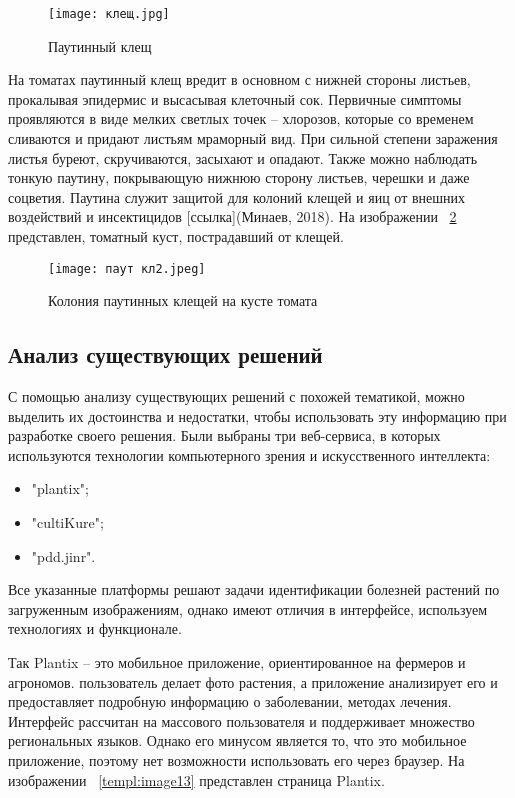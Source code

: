 \begin{figure}[h]
	\texttt{[image: клещ.jpg]}
	\caption{Паутинный клещ}
	\label{templ:image9}
\end{figure}

На томатах паутинный клещ вредит в основном с нижней стороны листьев, прокалывая эпидермис и высасывая клеточный сок. Первичные симптомы проявляются в виде мелких светлых точек -- хлорозов, которые со временем сливаются и придают листьям мраморный вид. При сильной степени заражения листья буреют, скручиваются, засыхают и опадают. Также можно наблюдать тонкую паутину, покрывающую нижнюю сторону листьев, черешки и даже соцветия. Паутина служит защитой для колоний клещей и яиц от внешних воздействий и инсектицидов [ссылка](Минаев, 2018). На изображении ~\ref{templ:image10} представлен, томатный куст, пострадавший от клещей.

\begin{figure}[H]
	\texttt{[image: паут кл2.jpeg]}
	\caption{Колония паутинных клещей на кусте томата}
	\label{templ:image10}
\end{figure}

\subsection{Анализ существующих решений}
С помощью анализу существующих решений с похожей тематикой, можно выделить их достоинства и недостатки, чтобы использовать эту информацию при разработке своего решения. 
Были выбраны три веб-сервиса, в которых используются технологии компьютерного зрения и искусственного интеллекта:
\begin{itemize}
	\item "plantix";
	\item  "cultiKure";
	\item "pdd.jinr".
\end{itemize}
Все указанные платформы решают задачи идентификации болезней растений по загруженным изображениям, однако имеют отличия в интерфейсе, используем технологиях и функционале.

Так Plantix -- это мобильное приложение, ориентированное на фермеров и агрономов. пользователь делает фото растения, а приложение анализирует его и предоставляет подробную информацию о заболевании, методах лечения. Интерфейс рассчитан на массового пользователя и поддерживает множество региональных языков. Однако его минусом является то, что это мобильное приложение, поэтому нет возможности использовать его через браузер. На изображении ~\ref{templ:image13} представлен страница Plantix.

